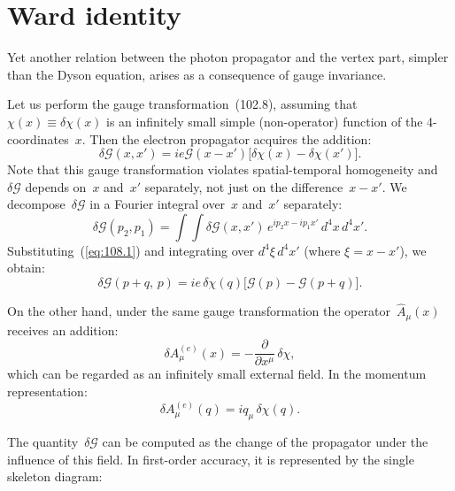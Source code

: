 
\section{Ward identity}


Yet another relation between the photon propagator and the vertex part, simpler than the Dyson equation, arises as a consequence of gauge invariance.

Let us perform the gauge transformation~(102.8), assuming that~$\chi(x) \equiv \delta\chi(x)$ is an infinitely small simple (non-operator) function of the 4-coordinates~$x$. Then the electron propagator acquires the addition:
\begin{equation}
\delta\mathcal{G}(x, x') = ie\mathcal{G}(x - x')\bigl[\delta\chi(x) - \delta\chi(x')\bigr].
\label{eq:108.1}
\end{equation}
Note that this gauge transformation violates spatial-temporal homogeneity and~$\delta\mathcal{G}$ depends on~$x$ and~$x'$ separately, not just on the difference~$x - x'$. We decompose~$\delta\mathcal{G}$ in a Fourier integral over~$x$ and~$x'$ separately:
\[
\delta\mathcal{G}(p_2, p_1) = \int\!\int \delta\mathcal{G}(x, x')\,e^{ip_2 x - ip_1 x'}\,d^4x\,d^4x'.
\]
Substituting~(\ref{eq:108.1}) and integrating over $d^4\xi\,d^4x'$ (where $\xi = x - x'$), we obtain:
\begin{equation}
\delta\mathcal{G}(p + q,\, p) = ie\,\delta\chi(q)\bigl[\mathcal{G}(p) - \mathcal{G}(p + q)\bigr].
\label{eq:108.2}
\end{equation}

On the other hand, under the same gauge transformation the operator~$\hat{A}_\mu(x)$ receives an addition:
\begin{equation}
\delta A^{(e)}_\mu(x) = -\frac{\partial}{\partial x^\mu}\,\delta\chi,
\label{eq:108.3}
\end{equation}
which can be regarded as an infinitely small external field. In the momentum representation:
\begin{equation}
\delta A^{(e)}_\mu(q) = iq_\mu\,\delta\chi(q).
\label{eq:108.4}
\end{equation}

The quantity~$\delta\mathcal{G}$ can be computed as the change of the propagator under the influence of this field. In first-order accuracy, it is represented by the single skeleton diagram:

\begin{equation}
\label{eq:108.5}
\end{equation}

